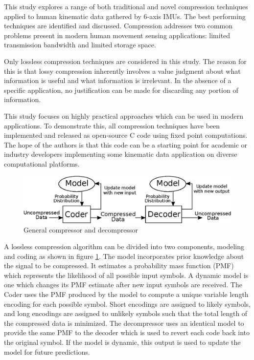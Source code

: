 \documentclass[journal]{IEEEtran}
\begin{document}
This study explores a range of both traditional and novel compression techniques applied to human kinematic data gathered by 6-axis IMUs. The best performing techniques are identified and discussed. Compression addresses two common problems present in modern human movement sensing applications: limited transmission bandwidth and limited storage space.

Only lossless compression techniques are considered in this study. The reason for this is that lossy compression inherently involves a value judgment about what information is useful and what information is irrelevant. In the absence of a specific application, no justification can be made for discarding any portion of information.

This study focuses on highly practical approaches which can be used in modern applications. To demonstrate this, all compression techniques have been implemented and released as open-source C code using fixed point computations. The hope of the authors is that this code can be a starting point for academic or industry developers implementing some kinematic data application on diverse computational platforms.

\begin{figure}
  \includegraphics[width=\linewidth]{general_compressor.eps}
  \caption{General compressor and decompressor}
  \label{fig:general_compressor}
\end{figure}

A lossless compression algorithm can be divided into two components, modeling and coding as shown in figure \ref{fig:general_compressor}. The model incorporates prior knowledge about the signal to be compressed. It estimates a probability mass function (PMF) which represents the likelihood of all possible input symbols. A dynamic model is one which changes its PMF estimate after new input symbols are received. The Coder uses the PMF produced by the model to compute a unique variable length encoding for each possible symbol. Short encodings are assigned to likely symbols, and long encodings are assigned to unlikely symbols such that the total length of the compressed data is minimized. The decompressor uses an identical model to provide the same PMF to the decoder which is used to revert each code back into the original symbol. If the model is dynamic, this output is used to update the model for future predictions.
\end{document}
